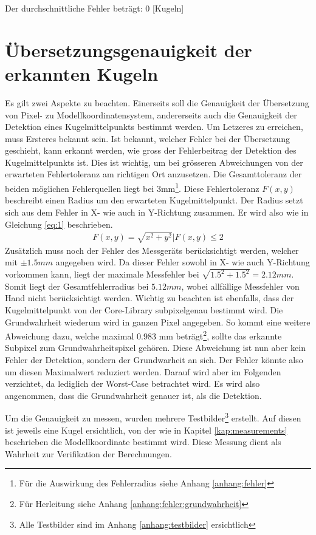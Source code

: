 Der durchschnittliche Fehler beträgt: 0 [Kugeln]

\section{Übersetzungsgenauigkeit der erkannten Kugeln}\label{kap:uebersetzungsgenauigkeit}
Es gilt zwei Aspekte zu beachten. Einerseits soll die Genauigkeit der Übersetzung von Pixel- zu Modellkoordinatensystem,
andererseits auch die Genauigkeit der Detektion eines Kugelmittelpunkts bestimmt werden.
Um Letzeres zu erreichen, muss Ersteres bekannt sein. Ist bekannt, welcher Fehler bei der Übersetzung geschieht, kann
erkannt werden, wie gross der Fehlerbeitrag der Detektion des Kugelmittelpunkts ist. Dies ist wichtig, um bei
grösseren Abweichungen von der erwarteten Fehlertoleranz am richtigen Ort anzusetzen. Die Gesamttoleranz der beiden
möglichen Fehlerquellen liegt bei 3mm\footnote{Für die Auswirkung des Fehlerradius siehe Anhang \ref{anhang:fehler}}. Diese Fehlertoleranz $F(x,y)$ beschreibt einen Radius um den erwarteten Kugelmittelpunkt.
Der Radius setzt sich aus dem Fehler in X- wie auch in Y-Richtung zusammen. Er wird also wie in Gleichung \ref{eq:1} beschrieben.
\begin{align}
    F(x,y) = \sqrt{x^2 + y^2} | F(x,y) \leq 2\label{eq:1}
\end{align}
Zusätzlich muss noch der Fehler des Messgeräts berücksichtigt werden, welcher mit $\pm 1.5mm$ angegeben wird. Da dieser
Fehler sowohl in X- wie auch Y-Richtung vorkommen kann, liegt der maximale Messfehler bei $\sqrt{1.5^2 + 1.5^2} = 2.12mm$. Somit liegt
der Gesamtfehlerradius bei $5.12mm$, wobei allfällige Messfehler von Hand nicht berücksichtigt werden. Wichtig zu beachten ist
ebenfalls, dass der Kugelmittelpunkt von der Core-Library subpixelgenau bestimmt wird. Die Grundwahrheit wiederum wird in
ganzen Pixel angegeben. So kommt eine weitere Abweichung dazu, welche maximal $0.983$ mm beträgt\footnote{Für Herleitung siehe Anhang \ref{anhang:fehler:grundwahrheit}},
sollte das erkannte Subpixel zum Grundwahrheitspixel gehören.
Diese Abweichung ist nun aber kein Fehler der Detektion, sondern der Grundwarheit an sich. Der Fehler könnte also um diesen
Maximalwert reduziert werden. Darauf wird aber im Folgenden verzichtet, da lediglich der Worst-Case betrachtet wird. Es wird
also angenommen, dass die Grundwahrheit genauer ist, als die Detektion.

Um die Genauigkeit zu messen, wurden mehrere Testbilder\footnote{Alle Testbilder sind im Anhang \ref{anhang:testbilder} ersichtlich}
erstellt. Auf diesen ist jeweils eine Kugel ersichtlich, von der
wie in Kapitel \ref{kap:measurements} beschrieben die Modellkoordinate bestimmt wird. Diese Messung dient als Wahrheit zur
Verifikation der Berechnungen.

